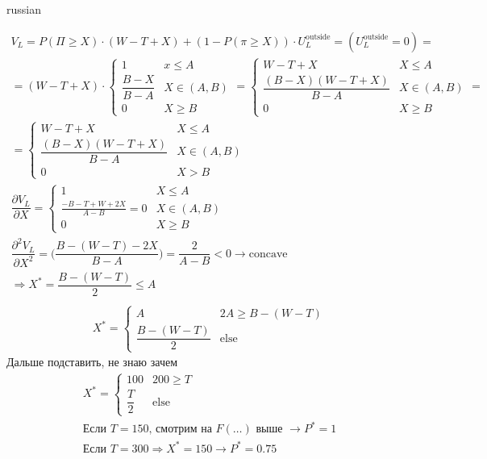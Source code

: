 \documentclass{article}
\begin{document}
\begin{otherlanguage*}{russian}
\begin{enumerate}
\begin{align*}
V_L = P ( \Pi \ge X) \cdot (W - T + X) + (1 - P( \pi \ge X)) \cdot U^{\text{outside}}_L = ( U^{\text{outside}}_L = 0 ) = \\
= (W - T + X) \cdot \begin{cases} 
1 & x \le A \\ 
\dfrac{B - X}{B - A} & X \in (A, B) \\
0 & X \ge B 
\end{cases} = \begin{cases} W - T + X & X \le A \\ \dfrac{(B - X)(W - T + X) }{B - A} & X \in (A, B) \\ 0 & X \ge B \end{cases} = \\
= \begin{cases} W - T + X & X \le A \\ \dfrac{(B - X) (W - T + X)}{B - A} & X \in (A, B) \\ 0 & X > B \end{cases} \\
\dfrac{\partial V_L}{\partial X} = \begin{cases} 
1 & X \le A \\ 
\frac{- B - T + W + 2 X}{A - B} = 0  & X \in (A, B) \\
0 & X \ge B 
\end{cases} \\
\dfrac{\partial ^ 2 V_L}{\partial X^2} = \Big(\dfrac{B - (W - T) - 2 X}{B - A} \Big) = \dfrac{2}{A - B} < 0 \rightarrow 
\text{concave} \\
\Rightarrow X^* = \dfrac{B - (W - T) }{2} \le A \\
\end{align*}
\begin{align*}
X^* = \begin{cases} A & 2 A \ge B - (W - T) \\ \dfrac{B - (W - T)}{2}& \text{else} \end{cases} 
\end{align*}
Дальше подставить, не знаю зачем
\begin{align*}
X^* = \begin{cases} 100 & 200 \ge T \\ \dfrac{T}{2} & \text{else} \end{cases}  \\ \text{Если } T = 150 \text{, смотрим на } F(\ldots) \text{ выше } \rightarrow P^* = 1 \\
\text{Если } T = 300 \Rightarrow X^* = 150  \rightarrow P^* = 0.75
\end{align*}
\end{enumerate}
\end{otherlanguage*} 
\end{document}
